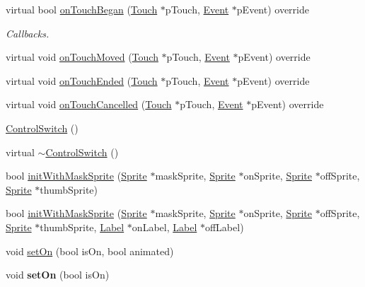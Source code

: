 \begin{DoxyCompactItemize}
\item 
virtual bool \hyperlink{classControlSwitch_a67af886fe24ec32313023514b28991f3}{on\+Touch\+Began} (\hyperlink{classTouch}{Touch} $\ast$p\+Touch, \hyperlink{classEvent}{Event} $\ast$p\+Event) override
\begin{DoxyCompactList}\small\item\em Callbacks. \end{DoxyCompactList}\item 
virtual void \hyperlink{classControlSwitch_a74e7f363deee0b399be486f668dad631}{on\+Touch\+Moved} (\hyperlink{classTouch}{Touch} $\ast$p\+Touch, \hyperlink{classEvent}{Event} $\ast$p\+Event) override
\item 
virtual void \hyperlink{classControlSwitch_a13db70a616ea0e992710fc8041792f66}{on\+Touch\+Ended} (\hyperlink{classTouch}{Touch} $\ast$p\+Touch, \hyperlink{classEvent}{Event} $\ast$p\+Event) override
\item 
virtual void \hyperlink{classControlSwitch_aa4c6a2f3766e9916f0619a0249ddd7d7}{on\+Touch\+Cancelled} (\hyperlink{classTouch}{Touch} $\ast$p\+Touch, \hyperlink{classEvent}{Event} $\ast$p\+Event) override
\item 
\hyperlink{classControlSwitch_a8efa38cf6b25871b6c1417f5965c656b}{Control\+Switch} ()
\item 
virtual \hyperlink{classControlSwitch_a3611bc626673e46fae1f30c398376aad}{$\sim$\+Control\+Switch} ()
\item 
bool \hyperlink{classControlSwitch_a3b67353d399371a96cd4231ba274ff0e}{init\+With\+Mask\+Sprite} (\hyperlink{classSprite}{Sprite} $\ast$mask\+Sprite, \hyperlink{classSprite}{Sprite} $\ast$on\+Sprite, \hyperlink{classSprite}{Sprite} $\ast$off\+Sprite, \hyperlink{classSprite}{Sprite} $\ast$thumb\+Sprite)
\item 
bool \hyperlink{classControlSwitch_adea9bc3322f3cc28ea660cb5d4b02b65}{init\+With\+Mask\+Sprite} (\hyperlink{classSprite}{Sprite} $\ast$mask\+Sprite, \hyperlink{classSprite}{Sprite} $\ast$on\+Sprite, \hyperlink{classSprite}{Sprite} $\ast$off\+Sprite, \hyperlink{classSprite}{Sprite} $\ast$thumb\+Sprite, \hyperlink{classLabel}{Label} $\ast$on\+Label, \hyperlink{classLabel}{Label} $\ast$off\+Label)
\item 
void \hyperlink{classControlSwitch_a3e696f55493149e7c6aebf4134304071}{set\+On} (bool is\+On, bool animated)
\item 
\mbox{\label{classControlSwitch_ac2bf0d1be9a00fcb4b5b9281849a6cd5}} 
void {\bfseries set\+On} (bool is\+On)

\end{DoxyCompactItemize}
